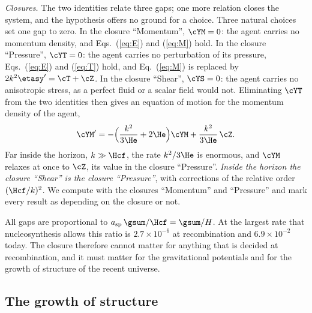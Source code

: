 \emph{Closures.} The two identities relate three gaps; one more relation closes the system, and the
hypothesis offers no ground for a choice. Three natural choices set one gap to zero. In the closure
``Momentum'', $\cYM=0$: the agent carries no momentum density, and
Eqs.~(\ref{eq:E}) and (\ref{eq:M}) hold. In the closure ``Pressure'', $\cYT=0$: the agent carries no
perturbation of its pressure, Eqs.~(\ref{eq:E}) and (\ref{eq:T}) hold, and Eq.~(\ref{eq:M}) is
replaced by $2k^{2}\etasy'=\cT+\cZ$. In the closure ``Shear'', $\cYS=0$: the agent carries no
anisotropic stress, as a perfect fluid or a scalar field would not. Eliminating $\cYT$ from the two
identities then gives an equation of motion for the momentum density of the agent,
\begin{equation}
\cYM'=-\Big(\frac{k^{2}}{3\He}+2\He\Big)\cYM+\frac{k^{2}}{3\He}\,\cZ .
\label{eq:shearclosure}
\end{equation}
Far inside the horizon, $k\gg\Hcf$, the rate $k^{2}/3\He$ is enormous, and $\cYM$ relaxes at once to
$\cZ$, its value in the closure ``Pressure''. \emph{Inside the horizon the closure ``Shear'' is the
closure ``Pressure''}, with corrections of the relative order $(\Hcf/k)^{2}$. We compute with the
closures ``Momentum'' and ``Pressure'' and mark every result as depending on the closure or not.

All gaps are proportional to $a_{\mathrm{sp}}\,\gsum/\Hcf=\gsum/H$. At the largest rate that
nucleosynthesis allows this ratio is $2.7\times10^{-6}$ at recombination and $6.9\times10^{-2}$
today. The closure therefore cannot matter for anything that is decided at recombination, and it
must matter for the gravitational potentials and for the growth of structure of the recent universe.

\subsection{The growth of structure}

